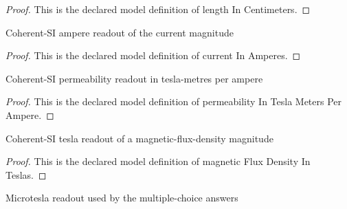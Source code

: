 \begin{proof}
  This is the declared model definition of length In Centimeters.
\end{proof}
\begin{definition}
  \label{def:physics:phyx-mini-0966:phyxminiproblems-problemphyxmini0966-currentinamperes}
  Coherent-SI ampere readout of the current magnitude
\end{definition}
\begin{proof}
  This is the declared model definition of current In Amperes.
\end{proof}
\begin{definition}
  \label{def:physics:phyx-mini-0966:phyxminiproblems-problemphyxmini0966-permeabilityinteslametersperampere}
  Coherent-SI permeability readout in tesla-metres per ampere
\end{definition}
\begin{proof}
  This is the declared model definition of permeability In Tesla Meters Per Ampere.
\end{proof}
\begin{definition}
  \label{def:physics:phyx-mini-0966:phyxminiproblems-problemphyxmini0966-magneticfluxdensityinteslas}
  Coherent-SI tesla readout of a magnetic-flux-density magnitude
\end{definition}
\begin{proof}
  This is the declared model definition of magnetic Flux Density In Teslas.
\end{proof}
\begin{definition}
  \label{def:physics:phyx-mini-0966:phyxminiproblems-problemphyxmini0966-magneticfluxdensityinmicroteslas}
  Microtesla readout used by the multiple-choice answers
\end{definition}
